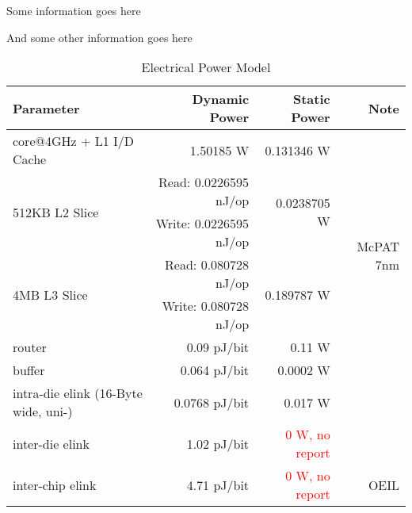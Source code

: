 \documentclass[../template.tex]{subfiles}
\begin{document}
\blindtext

\begin{noteblock}
	Some information goes here
	
	And some other information goes here
\end{noteblock}

\blindtext

\begin{table}[!htb]
	\centering
	\caption{Electrical Power Model}
	\label{tab:electricalPwrModel}		%
	\begin{adjustbox}{max width=\textwidth}  %
		\begin{threeparttable}
			\begin{tabular}{l r r r}
				\toprule
				\textbf{Parameter} 					  & \textbf{Dynamic Power}    & \textbf{Static Power} 			& \textbf{Note}					 \\ \midrule
				core@4GHz + L1 I/D Cache 			  & 1.50185 W  			      & 0.131346 W 		   				& \multirow[c]{7}{*}{McPAT 7nm}  \\
				\multirow[t]{2}{*}{512KB L2 Slice}    & Read: 0.0226595 nJ/op     & \multirow[t]{2}{*}{0.0238705 W} &            					 \\
				& Write: 0.0226595 nJ/op    &                                 &                                \\
				\multirow[t]{2}{*}{4MB L3 Slice}      & Read: 0.080728 nJ/op      & \multirow[t]{2}{*}{0.189787 W}  &                                \\
				& Write: 0.080728 nJ/op     &            						&								 \\
				router                                & 0.09 pJ/bit               & 0.11 W                          &                                \\
				buffer                                & 0.064 pJ/bit              & 0.0002 W                        &                                \\ \midrule
				intra-die elink (16-Byte wide, uni-)  & 0.0768 pJ/bit             & 0.017 W                         &                                \\
				inter-die elink                       & 1.02 pJ/bit               & \textcolor{red}{0 W, no report} & \cite{Something}               \\
				inter-chip elink \tnote{a}            & 4.71 pJ/bit               & \textcolor{red}{0 W, no report} & OEIL                           \\ \midrule

\end{tabular}
\end{threeparttable}
\end{adjustbox}
\end{table}
\end{document}
